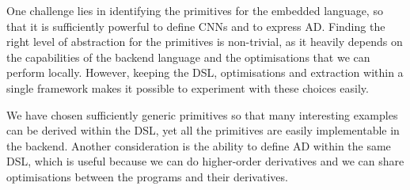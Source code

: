 One challenge lies in identifying the primitives for the embedded language,
so that it is sufficiently powerful to define CNNs and to express AD.
Finding the right level of abstraction for the primitives is non-trivial,
as it heavily depends on the capabilities of the backend language and the
optimisations that we can perform locally.  However, keeping the DSL,
optimisations and extraction within a single framework makes it possible
to experiment with these choices easily.


We have chosen sufficiently generic primitives so that many interesting
examples can be derived within the DSL, yet all the primitives are easily
implementable in the backend.  Another consideration is the ability to define
AD within the same DSL, which is useful because we can do higher-order
derivatives and we can share optimisations between the programs and their
derivatives.
\begin{code}[hide]%
\>[0]\AgdaSpace{}%
\AgdaSpace{}%
\<%
\\
\>[0][@{}l@{\AgdaIndent{0}}]%
\>[2]\<%
\\
%
\>[2]\AgdaSpace{}%
\AgdaSpace{}%
\AgdaSpace{}%
\AgdaSpace{}%
\AgdaSymbol{(}\AgdaSymbol{;}\AgdaSpace{}%
\AgdaSymbol{;}\AgdaSpace{}%
\AgdaSymbol{)}\<%
\\
%
\>[2]\AgdaSpace{}%
\AgdaSpace{}%
\<%
\\
%
\>[2]\AgdaSpace{}%
\AgdaSpace{}%
\<%
\\
\>[2][@{}l@{\AgdaIndent{0}}]%
\>[4]\AgdaSpace{}%
\AgdaSpace{}%
\<%
\\
%
\>[4]\AgdaSpace{}%
\AgdaSpace{}%
\<%
\\
%
\\[\AgdaEmptyExtraSkip]%
%
\>[2]\AgdaSpace{}%
\AgdaSpace{}%
\AgdaSpace{}%
\AgdaSymbol{(}\AgdaSymbol{;}\AgdaSpace{}%
\AgdaSymbol{;}\AgdaSpace{}%
\AgdaSymbol{;}\AgdaSpace{}%
\AgdaSymbol{;}\AgdaSpace{}%
\AgdaSymbol{;}\AgdaSpace{}%
\AgdaSymbol{)}\<%
\\
\>[0]\<%
\end{code}

